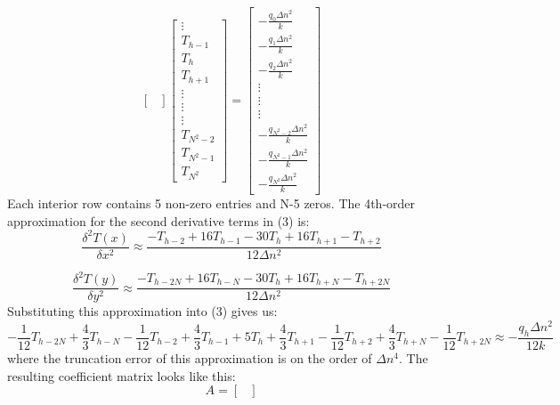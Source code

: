 \documentclass[letterpaper, 12pt]{article}
\begin{document}
\begin{flushleft}
\[\begin{bmatrix}
\end{bmatrix}
\begin{bmatrix}
    \vdots \\
    T_{h-1} \\
    T_{h} \\
    T_{h+1} \\
    \vdots \\
    \vdots \\
    \vdots \\
    T_{N^2-2} \\
    T_{N^2-1} \\
    T_{N^2}
\end{bmatrix}
=
\begin{bmatrix}
    - \frac{q_0 \Delta n^2}{k} \\
    - \frac{q_1 \Delta n^2}{k} \\
    - \frac{q_2 \Delta n^2}{k} \\
    \vdots \\
    \vdots \\
    \vdots \\
    - \frac{q_{N^2-2} \Delta n^2}{k} \\
    - \frac{q_{N^2-1} \Delta n^2}{k} \\
    - \frac{q_{N^2} \Delta n^2}{k}
\end{bmatrix}
\]
Each interior row contains 5 non-zero entries and N-5 zeros.
\vskip 5mm
The 4th-order approximation for the second derivative terms in (3) is:
\begin{equation}
    \frac{\delta^2 T(x)}{\delta x^2} \approx \frac{-T_{h-2} + 16T_{h-1} - 30T_h + 16T_{h+1} -T_{h+2}}{12 \Delta n^2}
\end{equation}

\begin{equation}
    \frac{\delta^2 T(y)}{\delta y^2} \approx \frac{-T_{h-2N} + 16T_{h-N} - 30T_h + 16T_{h+N} -T_{h+2N}}{12 \Delta n^2}
\end{equation}
Substituting this approximation into (3) gives us:
\begin{equation}
    -\frac{1}{12}T_{h-2N} + \frac{4}{3}T_{h-N} - \frac{1}{12}T_{h-2} + \frac{4}{3}T_{h-1} + 5T_h + \frac{4}{3}T_{h+1} - \frac{1}{12}T_{h+2} + \frac{4}{3}T_{h+N} - \frac{1}{12}T_{h+2N} \approx -\frac{q_h\Delta n^2}{12k}
\end{equation}
where the truncation error of this approximation is on the order of $\Delta n^4$. The resulting coefficient matrix looks like this:
\[ A =
\begin{bmatrix}


\end{bmatrix}\]
\end{flushleft}
\end{document}
